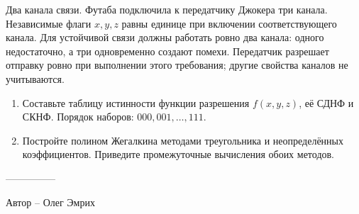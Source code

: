 \question
Два канала связи. Футаба подключила к передатчику Джокера три канала. Независимые флаги $x,y,z$ равны единице при включении соответствующего канала. Для устойчивой связи должны работать ровно два канала: одного недостаточно, а три одновременно создают помехи. Передатчик разрешает отправку ровно при выполнении этого требования; другие свойства каналов не учитываются.
\begin{enumerate}
\item Составьте таблицу истинности функции разрешения $f(x,y,z)$, её СДНФ и СКНФ. Порядок наборов: $000,001,\ldots,111$.
\item Постройте полином Жегалкина методами треугольника и неопределённых коэффициентов. Приведите промежуточные вычисления обоих методов.
\end{enumerate}

---------------

Автор -- Олег Эмрих
